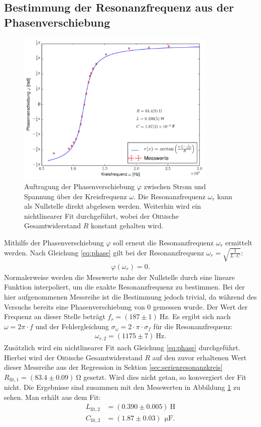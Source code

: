 \documentclass[12pt,a4paper,titlepage,headinclude]{scrartcl}
\numberwithin{equation}{subsection}
\newcommand{\mrm}[1]{\mathrm{#1}}
\newcommand{\person}[1]{\textsc{#1}}
\begin{document}
\subsection{Bestimmung der Resonanzfrequenz aus der Phasenverschiebung}
\label{sec:phasenverschiebung}
\begin{figure}[H]
	\centering
	\includegraphics[width=0.85\textwidth]{plot3.pdf}
	\caption{Auftragung der Phasenverschiebung $\varphi$ zwischen Strom und Spannung über der Kreisfrequenz $\omega$. Die Resonanzfrequenz $\omega_r$ kann als Nullstelle direkt abgelesen werden. Weiterhin wird ein nichtlinearer Fit durchgeführt, wobei der \person{Ohm}sche Gesamtwiderstand $R$ konstant gehalten wird.}
	\label{fig:plot3}
\end{figure}
Mithilfe der Phasenverschiebung $\varphi$ soll erneut die Resonanzfrequenz $\omega_r$ ermittelt werden. Nach Gleichung \eqref{eq:phase} gilt bei der Resonanzfrequenz $\omega_r=\sqrt{\frac{1}{L\cdot C}}$:
	\begin{align}
		\varphi(\omega_r)=0.
		\label{eq:phaseresonanz}
	\end{align}
Normalerweise werden die Messwerte nahe der Nullstelle durch eine lineare Funktion interpoliert, um die exakte Resonanzfrequenz zu bestimmen. Bei der hier aufgenommenen Messreihe ist die Bestimmung jedoch trivial, da während des Versuchs bereits eine Phasenverschiebung von 0 gemessen wurde. Der Wert der Frequenz an dieser Stelle beträgt $f_r=(187\pm1)~$Hz. Es ergibt sich nach $\omega=2\pi\cdot f$ und der Fehlergleichung $\sigma_{\omega}=2 \cdot \pi \cdot \sigma_{f}$ für die Resonanzfrequenz:
\begin{align}
	\omega_{r,2}=(1175\pm7)~\mrm{Hz}.
	\label{eq:resonnanzfrequenz2}
\end{align}
Zusätzlich wird ein nichtlinearer Fit nach Gleichung \eqref{eq:phase} durchgeführt. Hierbei wird der \person{Ohm}sche Gesamtwiderstand $R$ auf den zuvor erhaltenen Wert dieser Messreihe aus der Regression in Sektion \ref{sec:serienresonanzkreis} $R_{\mrm{fit},1}=(83.4\pm0.09)~\mrm{\Omega}$ gesetzt. Wird dies nicht getan, so konvergiert der Fit nicht. Die Ergebnisse sind zusammen mit den Messwerten in Abbildung \ref{fig:plot3} zu sehen. Man erhält aus dem Fit:
\begin{align}
	L_{\mrm{fit},2}&=(0.390\pm0.005)~\mrm{H}
	\label{eq:Lfit2}\\
	C_{\mrm{fit},2}&=(1.87\pm0.03)~\SI{}{\micro\farad}.
	\label{eq:Cfit2}
\end{align}
\end{document}
